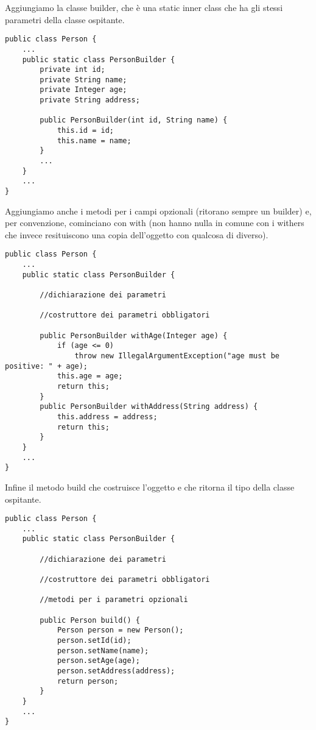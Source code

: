 Aggiungiamo la classe builder, che è una static inner class che ha gli stessi parametri della classe ospitante.

\begin{lstlisting}
public class Person {
    ...
    public static class PersonBuilder {
        private int id;
        private String name;
        private Integer age;
        private String address;
        
        public PersonBuilder(int id, String name) {
            this.id = id;
            this.name = name;
        }
        ...
    }
    ...
}    
\end{lstlisting}

Aggiungiamo anche i metodi per i campi opzionali (ritorano sempre un builder) e, per convenzione, cominciano con with (non hanno nulla in comune con i withers
che invece resituiscono una copia dell'oggetto con qualcosa di diverso).

\begin{lstlisting}
public class Person {
    ...
    public static class PersonBuilder {
        
        //dichiarazione dei parametri
        
        //costruttore dei parametri obbligatori
        
        public PersonBuilder withAge(Integer age) {
            if (age <= 0)
                throw new IllegalArgumentException("age must be positive: " + age);
            this.age = age;
            return this;
        }
        public PersonBuilder withAddress(String address) {
            this.address = address;
            return this;
        }
    }
    ...
}       
\end{lstlisting}

Infine il metodo build che costruisce l’oggetto e che ritorna il tipo della classe ospitante.

\begin{lstlisting}
public class Person {
    ...
    public static class PersonBuilder {
        
        //dichiarazione dei parametri
        
        //costruttore dei parametri obbligatori
        
        //metodi per i parametri opzionali

        public Person build() {
            Person person = new Person();
            person.setId(id);
            person.setName(name);
            person.setAge(age);
            person.setAddress(address);
            return person;
        }
    }
    ...
} 
\end{lstlisting}

